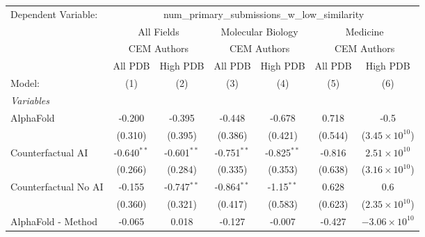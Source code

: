 \begingroup
\centering
\begin{tabular}{lcccccc}
   \tabularnewline \midrule \midrule
   Dependent Variable: & \multicolumn{6}{c}{num\_primary\_submissions\_w\_low\_similarity}\\
 & \multicolumn{2}{c}{All Fields} & \multicolumn{2}{c}{Molecular Biology} & \multicolumn{2}{c}{Medicine} \\
\cmidrule(lr){2-3} \cmidrule(lr){4-5} \cmidrule(lr){6-7}
 & \multicolumn{2}{c}{CEM Authors} & \multicolumn{2}{c}{CEM Authors} & \multicolumn{2}{c}{CEM Authors} \\
\cmidrule(lr){2-3} \cmidrule(lr){4-5} \cmidrule(lr){6-7}
 & \multicolumn{1}{c}{All PDB} & \multicolumn{1}{c}{High PDB} & \multicolumn{1}{c}{All PDB} & \multicolumn{1}{c}{High PDB} & \multicolumn{1}{c}{All PDB} & \multicolumn{1}{c}{High PDB} \\
\cmidrule(lr){2-2} \cmidrule(lr){3-3} \cmidrule(lr){4-4} \cmidrule(lr){5-5} \cmidrule(lr){6-6} \cmidrule(lr){7-7}
   Model:                                                     & (1)           & (2)           & (3)           & (4)           & (5)           & (6)\\  
   \midrule
   \emph{Variables}\\
   AlphaFold                                                  & -0.200        & -0.395        & -0.448        & -0.678        & 0.718         & -0.5\\   
                                                              & (0.310)       & (0.395)       & (0.386)       & (0.421)       & (0.544)       & ($3.45\times 10^{10}$)\\    
   Counterfactual AI                                          & -0.640$^{**}$ & -0.601$^{**}$ & -0.751$^{**}$ & -0.825$^{**}$ & -0.816        & $2.51\times 10^{10}$\\    
                                                              & (0.266)       & (0.284)       & (0.335)       & (0.353)       & (0.638)       & ($3.16\times 10^{10}$)\\    
   Counterfactual No AI                                       & -0.155        & -0.747$^{**}$ & -0.864$^{**}$ & -1.15$^{**}$  & 0.628         & 0.6\\   
                                                              & (0.360)       & (0.321)       & (0.417)       & (0.583)       & (0.623)       & ($2.35\times 10^{10}$)\\    
   AlphaFold - Method                                         & -0.065        & 0.018         & -0.127        & -0.007        & -0.427        & $-3.06\times 10^{10}$\\    

\end{tabular}
